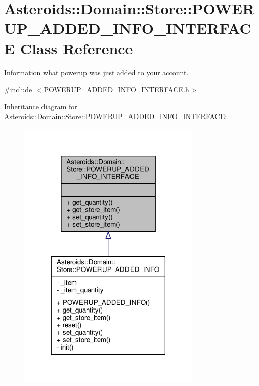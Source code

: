 \hypertarget{classAsteroids_1_1Domain_1_1Store_1_1POWERUP__ADDED__INFO__INTERFACE}{}\section{Asteroids\+:\+:Domain\+:\+:Store\+:\+:P\+O\+W\+E\+R\+U\+P\+\_\+\+A\+D\+D\+E\+D\+\_\+\+I\+N\+F\+O\+\_\+\+I\+N\+T\+E\+R\+F\+A\+CE Class Reference}
\label{classAsteroids_1_1Domain_1_1Store_1_1POWERUP__ADDED__INFO__INTERFACE}


Information what powerup was just added to your account.  




{\ttfamily \#include $<$P\+O\+W\+E\+R\+U\+P\+\_\+\+A\+D\+D\+E\+D\+\_\+\+I\+N\+F\+O\+\_\+\+I\+N\+T\+E\+R\+F\+A\+C\+E.\+h$>$}



Inheritance diagram for Asteroids\+:\+:Domain\+:\+:Store\+:\+:P\+O\+W\+E\+R\+U\+P\+\_\+\+A\+D\+D\+E\+D\+\_\+\+I\+N\+F\+O\+\_\+\+I\+N\+T\+E\+R\+F\+A\+CE\+:\nopagebreak
\begin{figure}[H]
\begin{center}
\leavevmode
\includegraphics[width=249pt]{classAsteroids_1_1Domain_1_1Store_1_1POWERUP__ADDED__INFO__INTERFACE__inherit__graph}
\end{center}
\end{figure}



